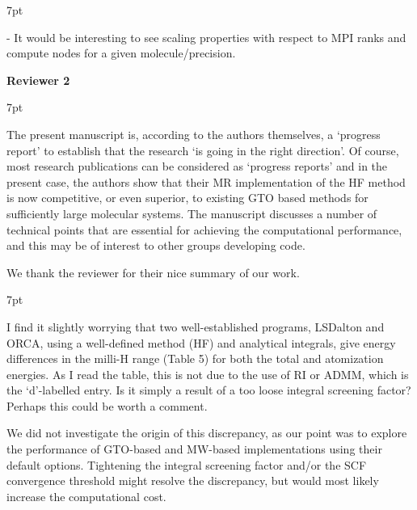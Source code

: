 \documentclass[11pt]{article}
\newenvironment{formal}{%
  \def\FrameCommand{%
    \hspace{1pt}%
    {\color{darkblue}\vrule width 2pt}%
    {\color{formalshade}\vrule width 4pt}%
    \colorbox{formalshade}%
  }%
  \MakeFramed{\advance\hsize-\width\FrameRestore}%
  \noindent\hspace{-4.55pt}%
  \begin{adjustwidth}{}{7pt}%
  \vspace{2pt}\vspace{2pt}%
}
{%
  \vspace{2pt}\end{adjustwidth}\endMakeFramed%
}
\begin{document}
\begin{formal}
 - It would be interesting to see scaling properties with respect to MPI ranks and compute nodes for a given molecule/precision.
\end{formal}



\clearpage

{\bf Reviewer 2}

\begin{formal}
The present manuscript is, according to the authors themselves, a ‘progress report’ to establish that the research ‘is going in the right direction’. Of course, most research publications can be considered as ‘progress reports’ and in the present case, the authors show that their MR implementation of the HF method is now competitive, or even superior, to existing GTO based methods for sufficiently large molecular systems. The manuscript discusses a number of technical points that are essential for achieving the computational performance, and this may be of interest to other groups developing code.
\end{formal}

We thank the reviewer for their nice summary of our work.

\begin{formal}
I find it slightly worrying that two well-established programs, LSDalton and ORCA, using a well-defined method (HF) and analytical integrals, give energy differences in the milli-H range (Table 5) for both the total and atomization energies. As I read the table, this is not due to the use of RI or ADMM, which is the ‘d’-labelled entry. Is it simply a result of a too loose integral screening factor? Perhaps this could be worth a comment.
\end{formal}

We did not investigate the origin of this discrepancy, as our point was to explore the performance of GTO-based and MW-based implementations using their default options. Tightening the integral screening factor and/or the SCF convergence threshold might resolve the discrepancy, but would most likely increase the computational cost.
\end{document}

